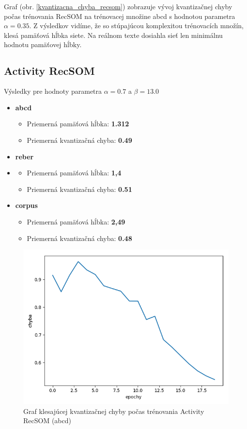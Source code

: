 Graf (obr. \ref{kvantizacna_chyba_recsom}) zobrazuje vývoj kvantizačnej chyby počas trénovania RecSOM
na trénovacej množine abcd s hodnotou parametra $\alpha = 0.35$.
Z výsledkov vidíme, že so stúpajúcou komplexitou trénovacích množín, klesá pamäťová hĺbka siete.
Na reálnom texte dosiahla sieť len minimálnu hodnotu pamäťovej hĺbky.

\subsection{Activity RecSOM}
Výsledky pre hodnoty parametra $\alpha = 0.7$ a $\beta = 13.0$
\begin{itemize}
    \item \textbf{abcd}
    \begin{itemize}
        \item Priemerná pamäťová hĺbka: \textbf{1.312}
        \item Priemerná kvantizačná chyba: \textbf{0.49}
    \end{itemize}
    \item \textbf{reber}
    \item \begin{itemize}
        \item Priemerná pamäťová hĺbka: \textbf{1,4}
        \item Priemerná kvantizačná chyba: \textbf{0.51}
    \end{itemize}
    \item \textbf{corpus}
    \begin{itemize}
        \item Priemerná pamäťová hĺbka: \textbf{2,49}
        \item Priemerná kvantizačná chyba: \textbf{0.48}
    \end{itemize}
\end{itemize}

\begin{figure}[H]
    \centering
    \includegraphics[width=\textwidth]{assets/ra_error_top}
    \caption{Graf klesajúcej kvantizačnej chyby počas trénovania Activity RecSOM (abcd)}
\end{figure}

